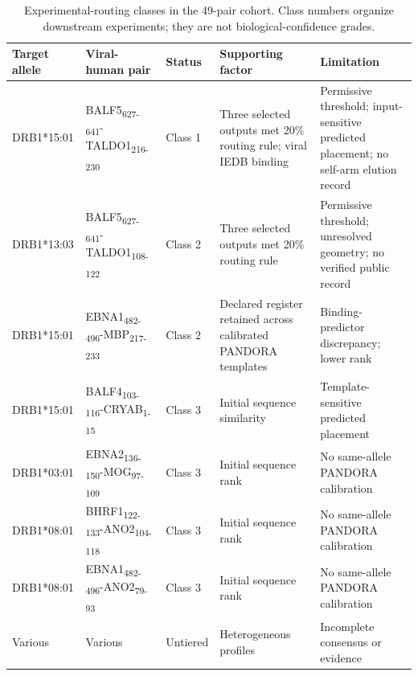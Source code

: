\documentclass[11pt]{article}
\newcommand{\pep}[2]{#1\textsubscript{#2}}
\begin{document}
\begin{table}[H]\centering\scriptsize
\caption{Experimental-routing classes in the 49-pair cohort. Class numbers organize downstream experiments; they are not biological-confidence grades.}
\label{tab:s3}
\setlength{\tabcolsep}{2pt}\renewcommand{\arraystretch}{1.2}
\begin{tabular}{p{}p{}p{}p{}p{}}
\toprule Target allele & Viral-human pair & Status & Supporting factor & Limitation \\\midrule
DRB1*15:01 & \pep{BALF5}{627-641}-\pep{TALDO1}{216-230} & Class 1 & Three selected outputs met 20\% routing rule; viral IEDB binding & Permissive threshold; input-sensitive predicted placement; no self-arm elution record\\
DRB1*13:03 & \pep{BALF5}{627-641}-\pep{TALDO1}{108-122} & Class 2 & Three selected outputs met 20\% routing rule & Permissive threshold; unresolved geometry; no verified public record\\
DRB1*15:01 & \pep{EBNA1}{482-496}-\pep{MBP}{217-233} & Class 2 & Declared register retained across calibrated PANDORA templates & Binding-predictor discrepancy; lower rank\\
DRB1*15:01 & \pep{BALF4}{103-116}-\pep{CRYAB}{1-15} & Class 3 & Initial sequence similarity & Template-sensitive predicted placement\\
DRB1*03:01 & \pep{EBNA2}{136-150}-\pep{MOG}{97-109} & Class 3 & Initial sequence rank & No same-allele PANDORA calibration\\
DRB1*08:01 & \pep{BHRF1}{122-133}-\pep{ANO2}{104-118} & Class 3 & Initial sequence rank & No same-allele PANDORA calibration\\
DRB1*08:01 & \pep{EBNA1}{482-496}-\pep{ANO2}{79-93} & Class 3 & Initial sequence rank & No same-allele PANDORA calibration\\
Various & Various & Untiered & Heterogeneous profiles & Incomplete consensus or evidence\\\bottomrule
\end{tabular}\end{table}
\end{document}
